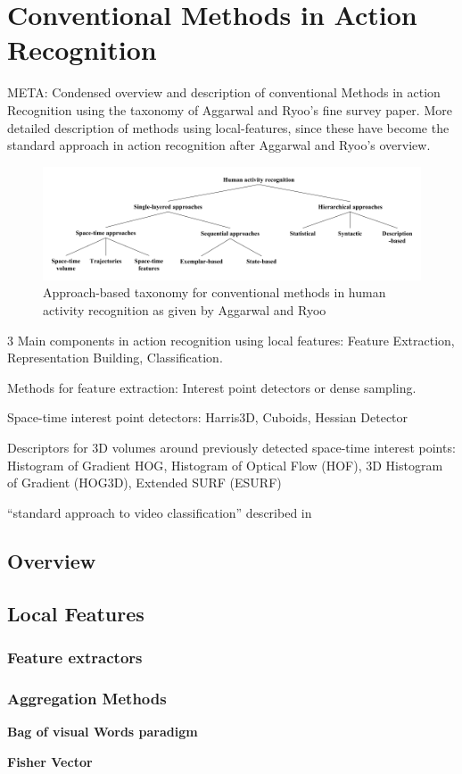 \section{Conventional Methods in Action Recognition}
META: 
Condensed overview and description of conventional Methods in action Recognition using the taxonomy of Aggarwal and Ryoo's fine survey paper.
More detailed description of methods using local-features, since these have become the standard approach in action recognition after Aggarwal and Ryoo's overview.

\begin{figure}[H]
    \centering
    \includegraphics[width=\textwidth]{img_conventional/taxonomy_conventional_methods.png}
    \caption{Approach-based taxonomy for conventional methods in human activity recognition as given by Aggarwal and Ryoo\cite{aggarwal_human_2011}}
    \label{fig:conventional_taxonomy}
\end{figure}

3 Main components in action recognition using local features: Feature Extraction, Representation Building, Classification.

Methods for feature extraction: Interest point detectors or dense sampling.

Space-time interest point detectors: Harris3D\cite{laptev_space-time_2005}, Cuboids\cite{dollar_behavior_2005}, Hessian Detector\cite{willems_efficient_2008}

Descriptors for 3D volumes around previously detected space-time interest points: Histogram of Gradient HOG\cite{dalal_histograms_2005-1}, Histogram of Optical Flow (HOF)\cite{laptev_learning_2008}, 3D Histogram of Gradient (HOG3D)\cite{klaser_spatio-temporal_2008}, Extended SURF (ESURF)\cite{willems_efficient_2008}

``standard approach to video classification'' described in \cite{karpathy_large-scale_2014}

\subsection{Overview}

\subsection{Local Features}

\subsubsection{Feature extractors}

\subsubsection{Aggregation Methods}

\textbf{Bag of visual Words paradigm}

\textbf{Fisher Vector}

